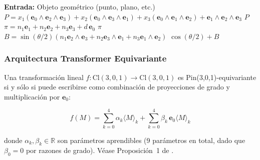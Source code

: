 \begin{algorithm}[H]
\caption{Embedding de Objetos Geométricos en GATr (PGA)}
\label{alg:embedding_gatr}
\begin{algorithmic}[1]
    \State \textbf{Entrada:} Objeto geométrico (punto, plano, etc.)
        \State $P = x_1 (\mathbf{e}_0 \wedge \mathbf{e}_2 \wedge \mathbf{e}_3) + x_2 (\mathbf{e}_0 \wedge \mathbf{e}_3 \wedge \mathbf{e}_1) + x_3 (\mathbf{e}_0 \wedge \mathbf{e}_1 \wedge \mathbf{e}_2) + \mathbf{e}_1 \wedge \mathbf{e}_2 \wedge \mathbf{e}_3$
        \State \Return $P$ 
    \EndFunction
        \State $\pi = n_1 \mathbf{e}_1 + n_2 \mathbf{e}_2 + n_3 \mathbf{e}_3 + d\, \mathbf{e}_0$
        \State \Return $\pi$ 
    \EndFunction
        \State $B = \sin(\theta/2) (n_1 \mathbf{e}_2 \wedge \mathbf{e}_3 + n_2 \mathbf{e}_3 \wedge \mathbf{e}_1 + n_3 \mathbf{e}_1 \wedge \mathbf{e}_2)$
        \State \Return $\cos(\theta/2) + B$ 
    \EndFunction
\end{algorithmic}
\end{algorithm}

\subsubsection{Arquitectura Transformer Equivariante}

\begin{definition}\label{def:capa_lineal_gatr}
Una transformación lineal $f: \text{Cl}(3,0,1) \to \text{Cl}(3,0,1)$ es Pin(3,0,1)-equivariante si y sólo si puede escribirse como combinación de proyecciones de grado y multiplicación por $\mathbf{e}_0$:

\begin{equation}
    f(M) = \sum_{k=0}^4 \alpha_k \langle M \rangle_k + \sum_{k=0}^4 \beta_k\, \mathbf{e}_0 \langle M \rangle_k
    \label{eq:linear_equivariant_gatr}
\end{equation}

donde $\alpha_k, \beta_k \in \mathbb{R}$ son parámetros aprendibles (9 parámetros en total, dado que $\beta_0 = 0$ por razones de grado). Véase Proposición~1 de \citet{brehmer2023geometric}.
\end{definition}

